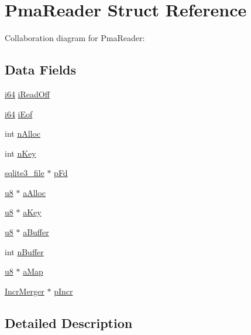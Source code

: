 \hypertarget{struct_pma_reader}{}\section{Pma\+Reader Struct Reference}
\label{struct_pma_reader}


Collaboration diagram for Pma\+Reader\+:
\subsection*{Data Fields}
\begin{DoxyCompactItemize}
\item 
\hyperlink{sqlite3_8c_a2a0f0f4ae7001eb54351f77ea1cdbcfd}{i64} \hyperlink{struct_pma_reader_a09bb995de66249294e0ae4715340f797}{i\+Read\+Off}
\item 
\hyperlink{sqlite3_8c_a2a0f0f4ae7001eb54351f77ea1cdbcfd}{i64} \hyperlink{struct_pma_reader_ae2045ce697bd581b187644cebea747cf}{i\+Eof}
\item 
int \hyperlink{struct_pma_reader_aec887fbb53f08664685baf4fb69ba5f5}{n\+Alloc}
\item 
int \hyperlink{struct_pma_reader_aec3f75e476fad43cd9f74b896c9c7a14}{n\+Key}
\item 
\hyperlink{structsqlite3__file}{sqlite3\+\_\+file} $\ast$ \hyperlink{struct_pma_reader_ae44362cf35caac454319be8c145e374e}{p\+Fd}
\item 
\hyperlink{sqlite3_8c_a74a0f6424ae628af25f23f0a35f6ead3}{u8} $\ast$ \hyperlink{struct_pma_reader_a1ddfef5f5a51dc36e8c4bf5166339531}{a\+Alloc}
\item 
\hyperlink{sqlite3_8c_a74a0f6424ae628af25f23f0a35f6ead3}{u8} $\ast$ \hyperlink{struct_pma_reader_adf9b023fcbeb5fc12b86f133c62c64f4}{a\+Key}
\item 
\hyperlink{sqlite3_8c_a74a0f6424ae628af25f23f0a35f6ead3}{u8} $\ast$ \hyperlink{struct_pma_reader_a0784b18f1d9bbdd738b38824a6166656}{a\+Buffer}
\item 
int \hyperlink{struct_pma_reader_aaa5118b1ad1ecd130e422b18371df061}{n\+Buffer}
\item 
\hyperlink{sqlite3_8c_a74a0f6424ae628af25f23f0a35f6ead3}{u8} $\ast$ \hyperlink{struct_pma_reader_a91583d916d2032c7d35235563f55f64e}{a\+Map}
\item 
\hyperlink{struct_incr_merger}{Incr\+Merger} $\ast$ \hyperlink{struct_pma_reader_a0a87839a608a5ba48d1c92694ae9cd5e}{p\+Incr}
\end{DoxyCompactItemize}


\subsection{Detailed Description}


